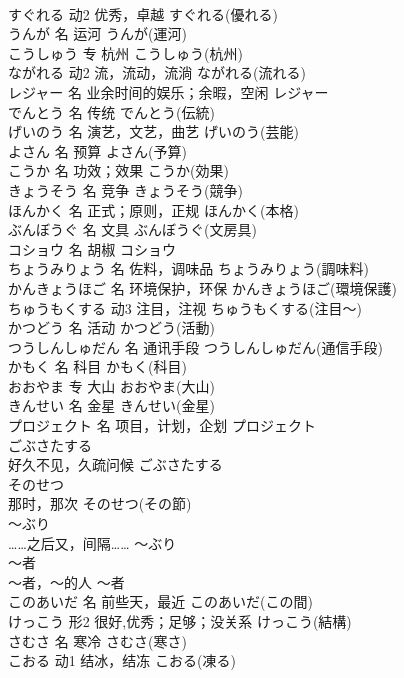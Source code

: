 \documentclass[8pt]{extreport}
\begin{document}
\begin{CJK}{UTF8}{min}
\\	すぐれる	动2	优秀，卓越	すぐれる(優れる)	
\\	うんが	名	运河	うんが(運河)	
\\	こうしゅう	专	杭州	こうしゅう(杭州)	
\\	ながれる	动2	流，流动，流淌	ながれる(流れる)	
\\	レジャー	名	业余时间的娱乐；余暇，空闲	レジャー	
\\	でんとう	名	传统	でんとう(伝統)	
\\	げいのう	名	演艺，文艺，曲艺	げいのう(芸能)	
\\	よさん	名	预算	よさん(予算)	
\\	こうか	名	功效；效果	こうか(効果)	
\\	きょうそう	名	竞争	きょうそう(競争)	
\\	ほんかく	名	正式；原则，正规	ほんかく(本格)	
\\	ぶんぼうぐ	名	文具	ぶんぼうぐ(文房具)	
\\	コショウ	名	胡椒	コショウ	
\\	ちょうみりょう	名	佐料，调味品	ちょうみりょう(調味料)	
\\	かんきょうほご	名	环境保护，环保	かんきょうほご(環境保護)	
\\	ちゅうもくする	动3	注目，注视	ちゅうもくする(注目～)	
\\	かつどう	名	活动	かつどう(活動)	
\\	つうしんしゅだん	名	通讯手段	つうしんしゅだん(通信手段)	
\\	かもく	名	科目	かもく(科目)	
\\	おおやま	专	大山	おおやま(大山)	
\\	きんせい	名	金星	きんせい(金星)	
\\	プロジェクト	名	项目，计划，企划	プロジェクト	
\\	ごぶさたする	
\\	好久不见，久疏问候	ごぶさたする	
\\	そのせつ	
\\	那时，那次	そのせつ(その節)	
\\	～ぶり	
\\	……之后又，间隔……	～ぶり	
\\	～者	
\\	～者，～的人	～者	
\\	このあいだ	名	前些天，最近	このあいだ(この間)	
\\	けっこう	形2	很好,优秀；足够；没关系	けっこう(結構)	
\\	さむさ	名	寒冷	さむさ(寒さ)	
\\	こおる	动1	结冰，结冻	こおる(凍る)	

\end{CJK}
\end{document}
